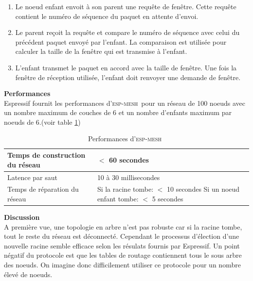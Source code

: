 \documentclass[a4paper, 12pt]{report}
\newcommand{\espmesh}{\textsc{esp-mesh}}
\begin{document}
            \begin{enumerate}
                \item Le noeud enfant envoit à son parent une requête de fenêtre. Cette requête contient le numéro de séquence du paquet en attente d'envoi.
                \item Le parent reçoit la requête et compare le numéro de séquence avec celui du précédent paquet envoyé par l'enfant.
                    La comparaison est utilisée pour calculer la taille de la fenêtre qui est transmise à l'enfant.
                \item L'enfant transmet le paquet en accord avec la taille de fenêtre. Une fois la fenêtre de réception utilisée, l'enfant doit renvoyer une demande de fenêtre.
            \end{enumerate}
        \vspace{0.5cm}
        \textbf{Performances}\\
            Espressif fournit les performances d'\espmesh\ pour un réseau de 100 noeuds avec un nombre maximum de couches de 6 
            et un nombre d'enfants maximum par noeuds de 6.(voir table \ref{performances_espMesh})
            \begin{table}[H]
                \begin{tabular}{|l|l|}
                    \hline
                    Temps de construction du réseau & $<$ 60 secondes\\ \hline
                    Latence par saut & 10 à 30 millisecondes\\ \hline
                    Temps de réparation du réseau & \makecell{Si la racine tombe: $<$ 10 secondes \\ Si un noeud enfant tombe: $<$ 5 secondes}\\ \hline
                \end{tabular}
                \caption{Performances d'\espmesh\ \cite{esp-mesh_w}}
                \label{performances_espMesh}
            \end{table}

            
        \textbf{Discussion}\\
            A première vue, une topologie en arbre n'est pas robuste car si la racine tombe,
            tout le reste du réseau est déconnecté. Cependant le processus d'élection
            d'une nouvelle racine semble efficace selon les résulats fournis par Espressif.
            Un point négatif du protocole est que les tables de routage contiennent tous le sous arbre des noeuds.
            On imagine donc difficilement utiliser ce protocole pour un nombre élevé de noeuds.
    
\end{document}
